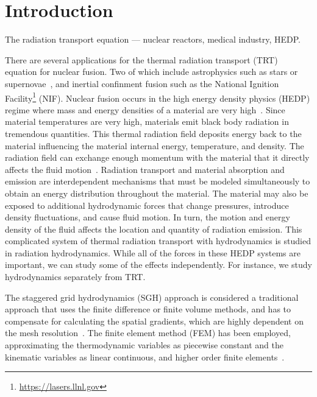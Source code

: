 \documentclass{article}
\begin{document}
\section{Introduction}
The radiation transport equation --- nuclear reactors, medical industry, HEDP.


There are several applications for the thermal radiation transport (TRT) equation for nuclear fusion. Two of which include astrophysics such as stars or supernovae~\cite{Castor_Rad_Hydro}, and inertial confinment fusion such as the National Ignition Facility\footnote{\url{https://lasers.llnl.gov}} (NIF). Nuclear fusion occurs in the high energy density physics (HEDP) regime where mass and energy densities of a material are very high~\cite{DrakeHEDPPaper, Castor_Rad_Hydro}. Since material temperatures are very high, materials emit black body radiation in tremendous quantities. This thermal radiation field deposits energy back to the material influencing the material internal energy, temperature, and density. The radiation field can exchange enough momentum with the material that it directly affects the fluid motion~\cite{Castor_Rad_Hydro}. Radiation transport and material absorption and emission are interdependent mechanisms that must be modeled simultaneously to obtain an energy distribution throughout the material. The material may also be exposed to additional hydrodynamic forces that change pressures, introduce density fluctuations, and cause fluid motion. In turn, the motion and energy density of the fluid affects the location and quantity of radiation emission. This complicated system of thermal radiation transport with hydrodynamics is studied in radiation hydrodynamics. While all of the forces in these HEDP systems are important, we can study some of the effects independently. For instance, we study hydrodynamics separately from TRT.

The staggered grid hydrodynamics (SGH) approach is considered a traditional approach that uses the finite difference or finite volume methods, and has to compensate for calculating the spatial gradients, which are highly dependent on the mesh resolution~\cite{DobrevHOFEMHydro}. The finite element method (FEM) has been employed, approximating the thermodynamic variables as piecewise constant and the kinematic variables as linear continuous\cite{ScovazziQ1P0Hydro}, and higher order finite elements~\cite{DobrevCurvilinearFEMHydro}.
\end{document}

